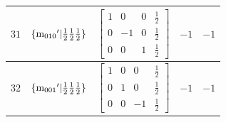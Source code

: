 \documentclass[fleqn,8pt]{jsarticle}
\begin{document}
\begin{longtable}{ccccc}
$ 31 $ & $ \{{\rm m}_{010}{}'|\frac{1}{2} \frac{1}{2} \frac{1}{2}\} $ & $ \begin{bmatrix} 1 & 0 & 0 & \frac{1}{2} \\ 0 & -1 & 0 & \frac{1}{2} \\ 0 & 0 & 1 & \frac{1}{2} \end{bmatrix} $ & $ -1 $ & $ -1 $ \\ \hline
$ 32 $ & $ \{{\rm m}_{001}{}'|\frac{1}{2} \frac{1}{2} \frac{1}{2}\} $ & $ \begin{bmatrix} 1 & 0 & 0 & \frac{1}{2} \\ 0 & 1 & 0 & \frac{1}{2} \\ 0 & 0 & -1 & \frac{1}{2} \end{bmatrix} $ & $ -1 $ & $ -1 $ \\
\end{longtable}
\end{document}

